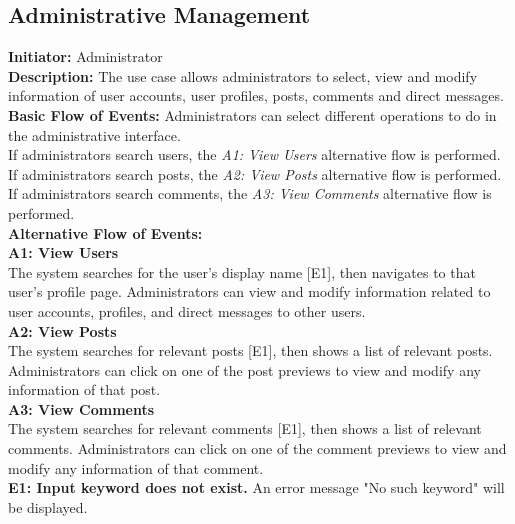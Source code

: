 \documentclass[a4paper,11pt]{scrreprt}
\begin{document}
\subsection{Administrative Management}
\textbf{\large Initiator: }Administrator\\
\textbf{\large Description: }The use case allows administrators to select, view and modify information of user accounts, user profiles, posts, comments and direct messages.\\
\textbf{\large Basic Flow of Events: }Administrators can select different operations to do in the administrative interface.\\
If administrators search users, the \textit{A1: View Users} alternative flow is performed.\\
If administrators search posts, the \textit{A2: View Posts} alternative flow is performed.\\
If administrators search comments, the \textit{A3: View Comments} alternative flow is performed.\\
\textbf{\large Alternative Flow of Events: }\\
\textbf{A1: View Users}\\
The system searches for the user's display name [E1], then navigates to that user's profile page. Administrators can view and modify information related to user accounts, profiles, and direct messages to other users.\\
\textbf{A2: View Posts}\\
The system searches for relevant posts [E1], then shows a list of relevant posts. Administrators can click on one of the post previews to view and modify any information of that post.\\
\textbf{A3: View Comments}\\
The system searches for relevant comments [E1], then shows a list of relevant comments. Administrators can click on one of the comment previews to view and modify any information of that comment.\\
\textbf{E1: Input keyword does not exist.} An error message "No such keyword" will be displayed.\\

\begin{figure}[H]
    \centering
    
\end{figure}
\end{document}
